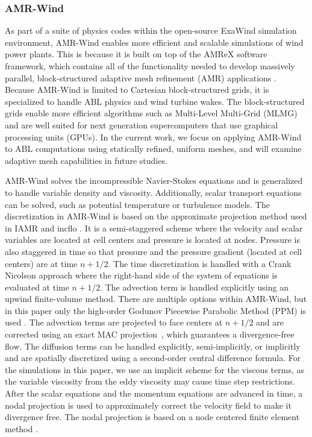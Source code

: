 \subsubsection{AMR-Wind}

As part of a suite of physics codes within the open-source ExaWind simulation environment,
AMR-Wind enables more efficient and scalable simulations of wind power plants.
This is because it is built on top of the AMReX software framework, which
contains all of the functionality needed to develop massively parallel,
block-structured adaptive mesh refinement (AMR) applications \cite{AMReX_JOSS}.
Because AMR-Wind is limited to Cartesian block-structured grids, it is
specialized to handle ABL physics and wind turbine wakes.  The block-structured
grids enable more efficient algorithms such as Multi-Level Multi-Grid (MLMG)
\cite{AMReX_JOSS} and are well suited for next generation supercomputers that
use graphical processing units (GPUs).  In the current work, we focus on
applying AMR-Wind to ABL computations using statically refined, uniform meshes,
and will examine adaptive mesh capabilities in future studies.

AMR-Wind solves the incompressible Navier-Stokes equations and is generalized to
handle variable density and viscosity. Additionally, scalar transport equations
can be solved, such as potential temperature or turbulence models. The
discretization in AMR-Wind is based on the approximate projection method used in
IAMR \cite{almgren1998conservative} and incflo \cite{sverdrup2018highly}. It is
a semi-staggered scheme where the velocity and scalar variables are located at
cell centers and pressure is located at nodes. Pressure is also staggered in
time so that pressure and the pressure gradient (located at cell centers) are at
time $n+1/2$.  The time discretization is handled with a Crank Nicolson
approach where the right-hand side of the system of equations is evaluated at
time $n+1/2$. The advection term is handled explicitly using an upwind
finite-volume method. There are multiple options within AMR-Wind, but in this
paper only the high-order Godunov Piecewise Parabolic Method (PPM) is used
\cite{Colella1984}. The advection terms are projected to face centers at $n+1/2$
and are corrected using an exact MAC projection~\cite{almgren1998conservative},
which guarantees a divergence-free flow. The diffusion terms can be handled
explicitly, semi-implicitly, or implicitly and are spatially discretized using a
second-order central difference formula.  For the simulations in this paper, we
use an implicit scheme for the viscous terms, as the variable viscosity from the eddy viscosity
may cause time step restrictions. After the scalar equations and the momentum
equations are advanced in time, a nodal projection is used to approximately
correct the velocity field to make it divergence free.  The nodal projection is
based on a node centered finite element method \cite{almgren1998conservative}.


